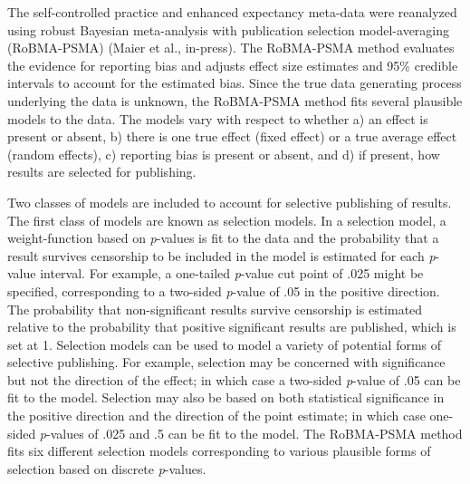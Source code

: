 \documentclass[
  doc, donotrepeattitle,floatsintext]{apa7}
\begin{document}
The self-controlled practice and enhanced expectancy meta-data were reanalyzed using robust Bayesian meta-analysis with publication selection model-averaging (RoBMA-PSMA) (Maier et al., in-press). The RoBMA-PSMA method evaluates the evidence for reporting bias and adjusts effect size estimates and 95\% credible intervals to account for the estimated bias. Since the true data generating process underlying the data is unknown, the RoBMA-PSMA method fits several plausible models to the data. The models vary with respect to whether a) an effect is present or absent, b) there is one true effect (fixed effect) or a true average effect (random effects), c) reporting bias is present or absent, and d) if present, how results are selected for publishing.

Two classes of models are included to account for selective publishing of results. The first class of models are known as selection models. In a selection model, a weight-function based on \emph{p}-values is fit to the data and the probability that a result survives censorship to be included in the model is estimated for each \emph{p}-value interval. For example, a one-tailed \emph{p}-value cut point of .025 might be specified, corresponding to a two-sided \emph{p}-value of .05 in the positive direction. The probability that non-significant results survive censorship is estimated relative to the probability that positive significant results are published, which is set at 1. Selection models can be used to model a variety of potential forms of selective publishing. For example, selection may be concerned with significance but not the direction of the effect; in which case a two-sided \emph{p}-value of .05 can be fit to the model. Selection may also be based on both statistical significance in the positive direction and the direction of the point estimate; in which case one-sided \emph{p}-values of .025 and .5 can be fit to the model. The RoBMA-PSMA method fits six different selection models corresponding to various plausible forms of selection based on discrete \emph{p}-values.
\end{document}
